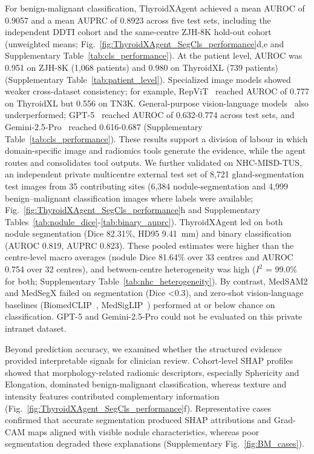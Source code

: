 \documentclass[fleqn,10pt]{wlscirep}
\begin{document}
For benign-malignant classification, ThyroidXAgent achieved a mean AUROC of 0.9057 and a mean AUPRC of 0.8923 across five test sets, including the independent DDTI cohort and the same-centre ZJH-8K hold-out cohort (unweighted means; Fig.~\ref{fig:ThyroidXAgent_SegCls_performance}d,e and Supplementary Table~\ref{tab:cls_performance}). At the patient level, AUROC was 0.951 on ZJH-8K (1,068 patients) and 0.980 on ThyroidXL (739 patients) (Supplementary Table~\ref{tab:patient_level}). Specialized image models showed weaker cross-dataset consistency; for example, RepViT~\cite{wang2023repvit} reached AUROC of 0.777 on ThyroidXL but 0.556 on TN3K. General-purpose vision-language models~\cite{dong2022survey} also underperformed; GPT-5~\cite{openai2025gpt5systemcard} reached AUROC of 0.632-0.774 across test sets, and Gemini-2.5-Pro~\cite{comanici_gemini_2025} reached 0.616-0.687 (Supplementary Table~\ref{tab:cls_performance}). These results support a division of labour in which domain-specific image and radiomics tools generate the evidence, while the agent routes and consolidates tool outputs. We further validated on NHC-MISD-TUS, an independent private multicentre external test set of 8,721 gland-segmentation test images from 35 contributing sites (6,384 nodule-segmentation and 4,999 benign--malignant classification images where labels were available; Fig.~\ref{fig:ThyroidXAgent_SegCls_performance}h and Supplementary Tables~\ref{tab:nodule_dice}-\ref{tab:binary_auprc}). ThyroidXAgent led on both nodule segmentation (Dice 82.31\%, HD95 9.41~mm) and binary classification (AUROC 0.819, AUPRC 0.823). These pooled estimates were higher than the centre-level macro averages (nodule Dice 81.64\% over 33 centres and AUROC 0.754 over 32 centres), and between-centre heterogeneity was high ($I^2$ = 99.0\% for both; Supplementary Table~\ref{tab:nhc_heterogeneity}). By contrast, MedSAM2 and MedSegX failed on segmentation (Dice <0.3), and zero-shot vision-language baselines (BiomedCLIP~\cite{zhang2024biomedclip}, MedSigLIP~\cite{sellergren2025medgemma}) performed at or below chance on classification. GPT-5 and Gemini-2.5-Pro could not be evaluated on this private intranet dataset.


Beyond prediction accuracy, we examined whether the structured evidence provided interpretable signals for clinician review. Cohort-level SHAP profiles~\cite{lundberg2017unified} showed that morphology-related radiomic descriptors, especially Sphericity and Elongation, dominated benign-malignant classification, whereas texture and intensity features contributed complementary information (Fig.~\ref{fig:ThyroidXAgent_SegCls_performance}f). Representative cases confirmed that accurate segmentation produced SHAP attributions and Grad-CAM maps aligned with visible nodule characteristics, whereas poor segmentation degraded these explanations (Supplementary Fig.~\ref{fig:BM_cases}).
\end{document}
